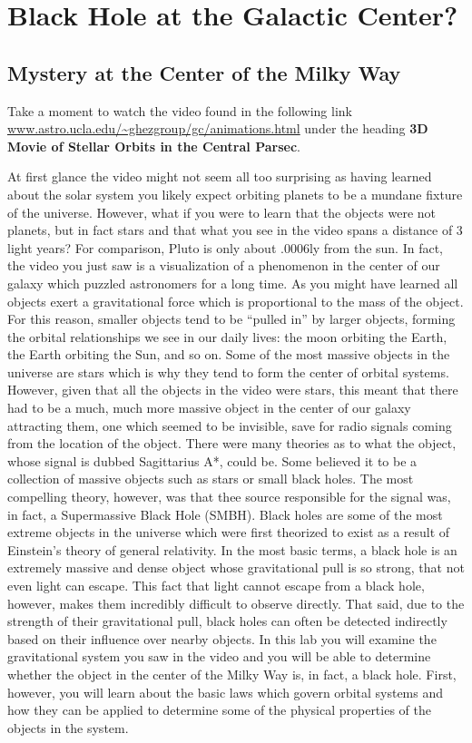 \chapter{Black Hole at the Galactic Center?}

\section{Mystery at the Center of the Milky Way}
\begin{steps}
	\item Take a moment to watch the video found in the following link \url{www.astro.ucla.edu/~ghezgroup/gc/animations.html} under the heading \textbf{3D Movie of Stellar Orbits in the Central Parsec}.
\end{steps}
At first glance the video might not seem all too surprising as having learned about the solar system you likely expect orbiting planets to be a mundane fixture of the universe. However, what if you were to learn that the objects were not planets, but in fact stars and that what you see in the video spans a distance of 3 light years? For comparison, Pluto is only about .0006ly from the sun. In fact, the video you just saw is a visualization of a phenomenon in the center of our galaxy which puzzled astronomers for a long time. As you might have learned all objects exert a gravitational force which is proportional to the mass of the object. For this reason, smaller objects tend to be ``pulled in'' by larger objects, forming the orbital relationships we see in our daily lives: the moon orbiting the Earth, the Earth orbiting the Sun, and so on. Some of the most massive objects in the universe are stars which is why they tend to form the center of orbital systems. However, given that all the objects in the video were stars, this meant that there had to be a much, much more massive object in the center of our galaxy attracting them, one which seemed to be invisible, save for radio signals coming from the location of the object. There were many theories as to what the object, whose signal is dubbed Sagittarius A*, could  be. Some believed it to be a collection of massive objects such as stars or small black holes. The most compelling theory, however, was that thee source responsible for the signal was, in fact, a Supermassive Black Hole (SMBH).
Black holes are some of the most extreme objects in the universe which were first theorized to exist as a result of Einstein's theory of general relativity. In the most basic terms, a black hole is an extremely massive and dense object whose gravitational pull is so strong, that not even light can escape. This fact that light cannot escape from a black hole,  however, makes them incredibly difficult to observe directly. That said, due to the strength of their gravitational pull, black holes can often be detected indirectly based on their influence over nearby objects. In this lab you will examine the gravitational system you saw in the video and you will be able to determine whether the object in the center of the Milky Way is, in fact, a black hole. First, however, you will learn about the basic laws which govern orbital systems and how they can be applied to determine some of the physical properties of the objects in the system.

